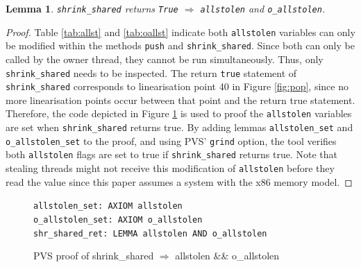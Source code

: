 \documentclass{sig-alternate-br}
\newtheorem{lemma}{Lemma}
\begin{document}
\begin{lemma}
	\texttt{shrink\_shared} returns \texttt{True} $\Rightarrow$ \texttt{allstolen} and \texttt{o\_allstolen}.
	\label{lem:shrinkshared}
\end{lemma}
\begin{proof}
	Table \ref{tab:allst} and \ref{tab:oallst} indicate both \texttt{allstolen} variables can only be modified within the methods \texttt{push} and \texttt{shrink\_shared}. Since both can only be called by the owner thread, they cannot be run simultaneously.  Thus, only \texttt{shrink\_shared} needs to be inspected. The return \texttt{true} statement of \texttt{shrink\_shared} corresponds to linearisation point 40 in Figure \ref{fig:pop}, since no more linearisation points occur between that point and the return true statement. Therefore, the code depicted in Figure \ref{pvs:shrshared} is used to proof the \texttt{allstolen} variables are set when \texttt{shrink\_shared} returns true. By adding lemmas \texttt{allstolen\_set} and \texttt{o\_allstolen\_set} to the proof, and using PVS' \texttt{grind} option, the tool verifies both \texttt{allstolen} flags are set to true if \texttt{shrink\_shared} returns true. Note that stealing threads might not receive this modification of \texttt{allstolen} before they read the value since this paper assumes a system with the x86 memory model.
\end{proof}
\begin{figure}
	\texttt{allstolen\_set: AXIOM allstolen}\\
	\texttt{o\_allstolen\_set: AXIOM o\_allstolen}\\
	\texttt{shr\_shared\_ret: LEMMA allstolen AND o\_allstolen}
	\caption{PVS proof of shrink\_shared $\Rightarrow$ allstolen \&\& o\_allstolen}
	\label{pvs:shrshared}
\end{figure}
\end{document}
